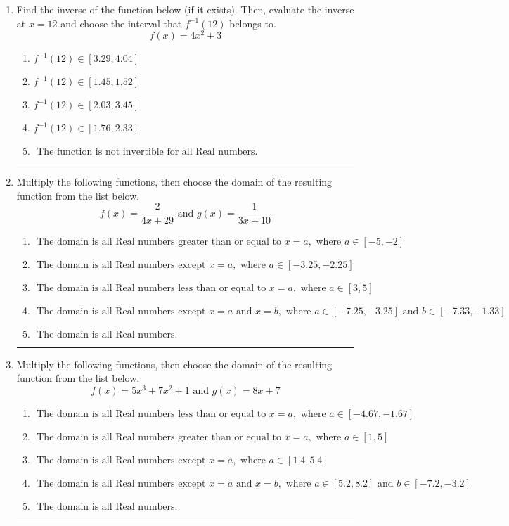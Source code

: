 \documentclass[14pt]{extbook}
\newcommand{\litem}[1]{\item#1\hspace*{-1cm}\rule{\textwidth}{0.4pt}}
\begin{document}
\begin{enumerate}
\litem{
Find the inverse of the function below (if it exists). Then, evaluate the inverse at $x = 12$ and choose the interval that $f^{-1}(12)$ belongs to.\[ f(x) = 4 x^2 + 3 \]\begin{enumerate}[label=\Alph*.]
\item \( f^{-1}(12) \in [3.29, 4.04] \)
\item \( f^{-1}(12) \in [1.45, 1.52] \)
\item \( f^{-1}(12) \in [2.03, 3.45] \)
\item \( f^{-1}(12) \in [1.76, 2.33] \)
\item \( \text{ The function is not invertible for all Real numbers. } \)

\end{enumerate} }
\litem{
Multiply the following functions, then choose the domain of the resulting function from the list below.\[ f(x) = \frac{2}{4x+29} \text{ and } g(x) = \frac{1}{3x+10} \]\begin{enumerate}[label=\Alph*.]
\item \( \text{ The domain is all Real numbers greater than or equal to } x = a, \text{ where } a \in [-5, -2] \)
\item \( \text{ The domain is all Real numbers except } x = a, \text{ where } a \in [-3.25, -2.25] \)
\item \( \text{ The domain is all Real numbers less than or equal to } x = a, \text{ where } a \in [3, 5] \)
\item \( \text{ The domain is all Real numbers except } x = a \text{ and } x = b, \text{ where } a \in [-7.25, -3.25] \text{ and } b \in [-7.33, -1.33] \)
\item \( \text{ The domain is all Real numbers. } \)

\end{enumerate} }
\litem{
Multiply the following functions, then choose the domain of the resulting function from the list below.\[ f(x) = 5x^{3} +7 x^{2} + 1 \text{ and } g(x) = 8x + 7 \]\begin{enumerate}[label=\Alph*.]
\item \( \text{ The domain is all Real numbers less than or equal to } x = a, \text{ where } a \in [-4.67, -1.67] \)
\item \( \text{ The domain is all Real numbers greater than or equal to } x = a, \text{ where } a \in [1, 5] \)
\item \( \text{ The domain is all Real numbers except } x = a, \text{ where } a \in [1.4, 5.4] \)
\item \( \text{ The domain is all Real numbers except } x = a \text{ and } x = b, \text{ where } a \in [5.2, 8.2] \text{ and } b \in [-7.2, -3.2] \)
\item \( \text{ The domain is all Real numbers. } \)


\end{enumerate}}
\end{enumerate}
\end{document}
